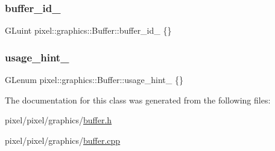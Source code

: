 \subsubsection{\texorpdfstring{buffer\+\_\+id\+\_\+}{buffer\_id\_}}
{\footnotesize\ttfamily G\+Luint pixel\+::graphics\+::\+Buffer\+::buffer\+\_\+id\+\_\+ \{\}}

\mbox{\label{classpixel_1_1graphics_1_1_buffer_a8c1f22b44385b66d4b05a6f4d7f6a6ba}} 
\subsubsection{\texorpdfstring{usage\+\_\+hint\+\_\+}{usage\_hint\_}}
{\footnotesize\ttfamily G\+Lenum pixel\+::graphics\+::\+Buffer\+::usage\+\_\+hint\+\_\+ \{\}}



The documentation for this class was generated from the following files\+:\begin{DoxyCompactItemize}
\item 
pixel/pixel/graphics/\hyperlink{buffer_8h}{buffer.\+h}\item 
pixel/pixel/graphics/\hyperlink{buffer_8cpp}{buffer.\+cpp}\end{DoxyCompactItemize}
